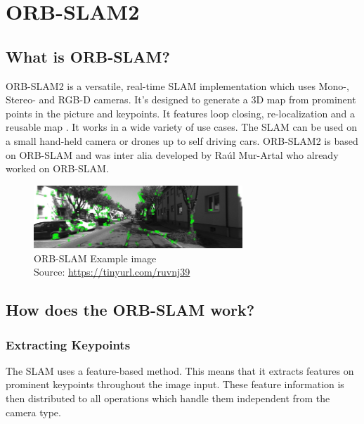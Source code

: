 
\chapter{ORB-SLAM2\authorA}\label{ref:orbslam}

\section{What is ORB-SLAM?}
ORB-SLAM2 is a versatile, real-time SLAM implementation which uses Mono-, Stereo- and RGB-D cameras. It's designed to generate a 3D map from prominent points in the picture and keypoints. It features loop closing, re-localization and a reusable map \cite{orbslam2}. It works in a wide variety of use cases. The SLAM can be used on a small hand-held camera or drones up to self driving cars.
ORB-SLAM2 is based on ORB-SLAM and was inter alia developed by Raúl Mur-Artal who already worked on ORB-SLAM.\newline

\begin{figure}[h]
	\centering
	\includegraphics[width=0.7\textwidth]{./media/images/orb-slam-kitti-dataset.png}
  	\caption{ORB-SLAM Example image
  	\\Source: \url{https://tinyurl.com/ruvnj39}}
  	\label{rosstructure}
\end{figure}

\section{How does the ORB-SLAM work?}

\subsection{Extracting Keypoints}
The SLAM uses a feature-based method. This means that it extracts features on prominent keypoints throughout the image input. These feature information is then distributed to all operations which handle them independent from the camera type. \cite{orbslam2} \newline\newline


